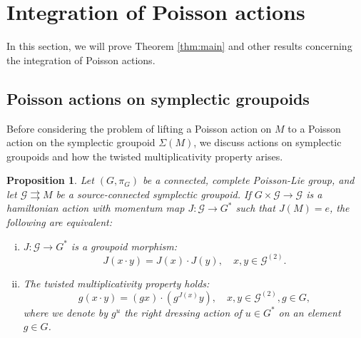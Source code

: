 \documentclass[a4paper,11pt]{amsart}
\newtheorem{prop}[thm]{Proposition}
\theoremstyle{definition}
\theoremstyle{remark}
\begin{document}
\section{Integration of Poisson actions}\label{sec:actions}                
In this section, we will prove Theorem \ref{thm:main} and other
results concerning the integration of Poisson actions.

\subsection{Poisson actions on symplectic groupoids}           \label{subsec:twisted:action}                                  
Before considering the problem of lifting a Poisson action on $M$
to a Poisson action on the symplectic groupoid $\Sigma(M)$, we
discuss actions on symplectic groupoids and how the twisted
multiplicativity property arises.

\begin{prop}
\label{prop:main:aux}
Let $(G,\pi_G)$ be a connected, complete
Poisson-Lie group, and let ${\mathcal{G}}{\rightrightarrows} M$ be a source-connected symplectic
groupoid. If $G\times{\mathcal{G}}\to {\mathcal{G}}$ is a hamiltonian action with momentum
map $J:{\mathcal{G}}\to G^*$ such that $J(M)={e}$, the following are
equivalent:
\begin{enumerate}[(i)]
\item $J:{\mathcal{G}}\to G^*$ is a groupoid morphism:
\[ J(x\cdot y)=J(x)\cdot J(y),\quad x,y\in{\mathcal{G}}^{(2)}.\]
\item The twisted multiplicativity property holds:
\begin{equation}
\label{eq:twisted:2}
g(x\cdot y)=(gx)\cdot (g^{J(x)}y),\quad x,y\in{\mathcal{G}}^{(2)}, g\in G,
\end{equation}
where we denote by $g^u$ the right dressing action of $u\in G^*$
on an element $g\in G$.
\end{enumerate}
\end{prop}
\end{document}
